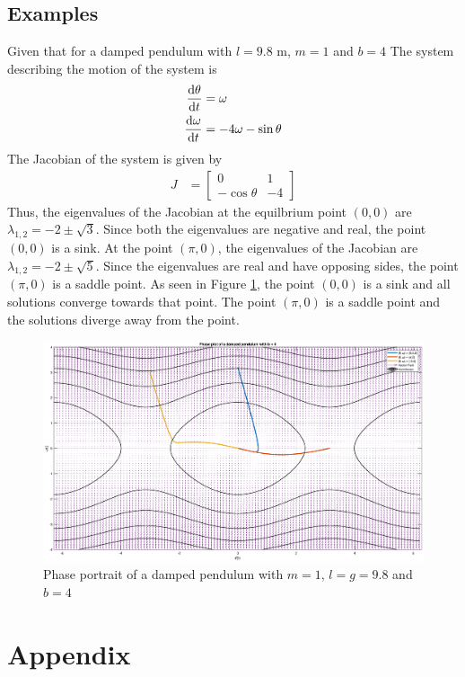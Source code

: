 \documentclass[12pt,1in]{article}
\newenvironment{Example}[2][Example]{\begin{trivlist}
		\item[\hskip \labelsep {\bfseries #1}\hskip \labelsep {\bfseries #2.}]}{\end{trivlist}}
\begin{document}
\subsection{Examples}
\begin{Example}{1}
	\cite[pp. 528]{diff_eq}
	Given that for a damped pendulum with $l = 9.8$ \si{\meter}, $m = 1$ and $b  =  4$
	The system describing the motion of the system is 
	\begin{align*}
	\derivative{\theta}{t} &= \omega \\
	\derivative{\omega}{t} &= - 4\omega - \sin\theta
	\end{align*}
	The Jacobian of the system is given by 
	\begin{align*}
	J &= \begin{bmatrix}
	0 & 1 \\
	-\cos\theta & -4 
	\end{bmatrix}
	\end{align*}
	Thus, the eigenvalues of the Jacobian at the equilbrium point $(0,0)$ are $\lambda_{1,2} = -2 \pm \sqrt{3}$. Since both the eigenvalues are negative and real, the point $(0,0)$ is a sink. At the point $(\pi, 0)$, the eigenvalues of the Jacobian are $\lambda_{1,2} = -2 \pm \sqrt{5}$. Since the eigenvalues are real and have opposing sides, the point $(\pi,0)$ is a saddle point. As seen in Figure \ref{fig:example_damped_pendulum}, the point $(0,0)$ is a sink and all solutions converge towards that point. The point $(\pi, 0)$ is a saddle point and the solutions diverge away from the point. 
	\begin{figure}[H]
		\centering
		\includegraphics[trim={2in 0 1.5in 0}, width=\linewidth]{Figures/example_damped_pendulum}
		\caption{Phase portrait of a damped pendulum with $m = 1$, $l = g = 9.8$ and $b = 4$}
		\label{fig:example_damped_pendulum}
	\end{figure}
\end{Example}
\section{Appendix}



\end{document}
